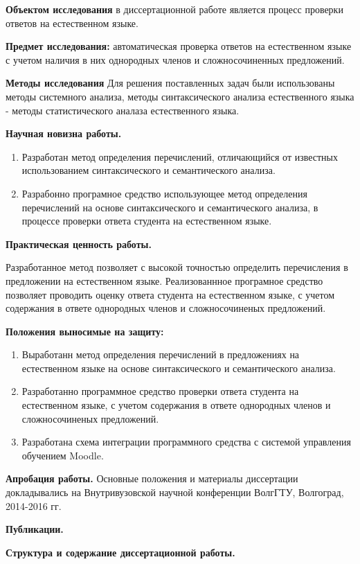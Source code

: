 \documentclass[a4paper]{G2-105}
\begin{document}
\par \textbf{Объектом исследования} в диссертационной работе является процесс проверки ответов на естественном языке.
\par \textbf{Предмет исследования:} автоматическая проверка ответов на естественном языке с учетом наличия в них однородных членов и сложносочиненных предложений.
\par \textbf{Методы исследования} Для решения поставленных задач были использованы методы системного анализа, методы синтаксического анализа естественного языка - методы статистического аналаза естественного языка.

\par \textbf{Научная новизна работы.} %
\begin{enumerate}
    \item Разработан метод определения перечислений, отличающийся от известных использованием синтаксического и семантического анализа.
    \item Разрабонно програмное средство использующее метод определения перечислений на основе синтаксического и семантического анализа, в процессе проверки ответа студента на естественном языке.
\end{enumerate}

\par \textbf{Практическая ценность работы.} %
\par Разработанное метод позволяет с высокой точностью определить перечисления в предложении на естественном языке. Реализованнное програмное средство позволяет проводить оценку ответа студента на естественном языке, с учетом содержания в ответе однородных членов и сложносочиненых предложений.

\par \textbf{Положения выносимые на защиту:} %
\begin{enumerate}
    \item Выработанн метод определения перечислений в предложениях на естественном языке на основе синтаксического и семантического анализа.
    \item Разработанно программное средство проверки ответа студента на естественном языке, с учетом содержания в ответе однородных членов и сложносочиненых предложений.
    \item Разработана схема интеграции программного средства с системой управления обучением Moodle.
\end{enumerate}
\par \textbf{Апробация работы.} Основные положения и материалы диссертации докладывались на Внутривузовской научной конференции ВолгГТУ, Волгоград, 2014-2016 гг.

\par \textbf{Публикации.} %

\par \textbf{Структура и содержание диссертационной работы.} %
\end{document}
